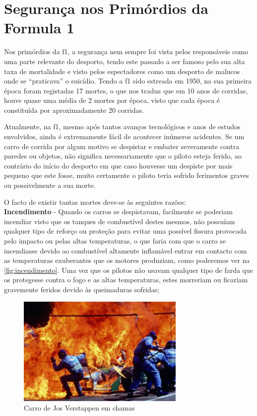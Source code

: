 \documentclass{report}
\begin{document}
\chapter{Segurança nos Primórdios da Formula 1 }
    Nos primórdios da \ac{f1}, a segurança nem sempre foi vista pelos responsáveis como uma parte relevante do desporto, tendo este passado a ser famoso pelo sua alta taxa de mortalidade e visto pelos espectadores como um desporto de malucos onde se “praticava” o suicídio.	 Tendo a \ac{f1} sido estreada em 1950, na sua primeira época foram registadas 17 mortes, o que nos traduz que em 10 anos de corridas, houve quase uma média de 2 mortes por época, visto que cada época é constituída por aproximadamente 20 corridas.


Atualmente, na \ac{f1}, mesmo após tantos avanços tecnológicos e anos de estudos envolvidos, ainda é extremamente fácil de acontecer inúmeros acidentes. Se um carro de corrida por algum motivo se despistar e embater severamente contra paredes ou objetos, não significa necessariamente que o piloto esteja ferido, ao contrário do início do desporto em que caso houvesse um despiste por mais pequeno que este fosse, muito certamente o piloto teria sofrido ferimentos graves ou possivelmente a sua morte. 


O facto de existir tantas mortes deve-se às seguintes razões:\\[0.5cm]
\textbf{Incendimento} - Quando os carros se despistavam, facilmente se poderiam incendiar visto que os tanques de combustível destes mesmos, não possuíam qualquer tipo de reforço ou proteção para evitar uma possível fissura provocada pelo impacto ou pelas altas temperaturas, o que faria com que o carro se incendiasse devido ao combustível altamente inflamável entrar em contacto com as temperaturas exuberantes que os motores produziam, como poderemos ver na \autoref{fig:incendimento}. Uma vez que os pilotos não usavam qualquer tipo de farda que os protegesse contra o fogo e as altas temperaturas, estes morreriam ou ficariam gravemente feridos devido às queimaduras sofridas;\\[1.1cm]
\begin{figure}[h]
\center %
\includegraphics[height=150pt]{incendimento}
\caption{Carro de Jos Verstappen em chamas}
\label{fig:incendimento}
\end{figure}
\end{document}
